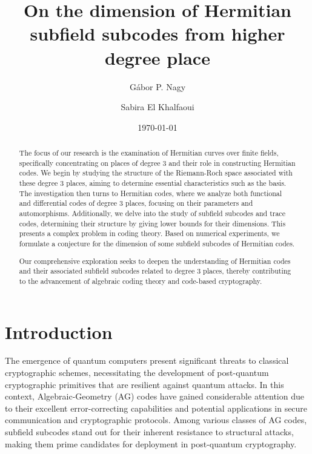 \documentclass[11pt]{amsart}
\title{On the dimension of Hermitian subfield subcodes from higher degree place}
\author{G\'{a}bor P. Nagy}
\author{Sabira El Khalfaoui}
\date{\today}
\theoremstyle{plain}
\theoremstyle{definition}
\theoremstyle{remark}
\begin{document}
\maketitle


\begin{abstract}
The focus of our research is the examination of Hermitian curves over finite fields, specifically concentrating on places of degree 3 and their role in constructing Hermitian codes. We begin by studying the structure of the Riemann-Roch space associated with these degree 3 places, aiming to determine essential characteristics such as the basis. The investigation then turns to Hermitian codes, where we analyze both functional and differential codes of degree 3 places, focusing on their parameters and automorphisms. Additionally, we delve into the study of subfield subcodes and trace codes, determining their structure by giving lower bounds for their dimensions. This presents a complex problem in coding theory. Based on numerical experiments, we formulate a conjecture for the dimension of some subfield subcodes of Hermitian codes. 

Our comprehensive exploration seeks to deepen the understanding of Hermitian codes and their associated subfield subcodes related to degree 3 places, thereby contributing to the advancement of algebraic coding theory and code-based cryptography.
\end{abstract}





\section{Introduction}

The emergence of quantum computers present significant threats to classical cryptographic schemes, necessitating the development of post-quantum cryptographic primitives that are resilient against quantum attacks. In this context, Algebraic-Geometry (AG) codes have gained considerable attention due to their excellent error-correcting capabilities and potential applications in secure communication and cryptographic protocols. Among various classes of AG codes, subfield subcodes stand out for their inherent resistance to structural attacks, making them prime candidates for deployment in post-quantum cryptography.
\end{document}
